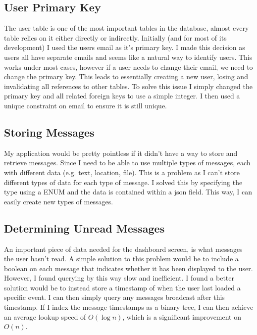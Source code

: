 \documentclass[a4paper,oneside,12pt,draft]{report}
\begin{document}
	\subsection{User Primary Key}
	The user table is one of the most important tables in the database, almost every table relies on it either directly or indirectly. Initially (and for most of its development) I used the users email as it's primary key. I made this decision as users all have separate emails and seems like a natural way to identify users. This works under most cases, however if a user needs to change their email, we need to change the primary key. This leads to essentially creating a new user, losing and invalidating all references to other tables. To solve this issue I simply changed the primary key and all related foreign keys to use a simple integer. I then used a unique constraint on email to ensure it is still unique.

	\subsection{Storing Messages}
	My application would be pretty pointless if it didn’t have a way to store and retrieve messages. Since I need to be able to use multiple types of messages, each with different data (e.g. text, location, file). This is a problem as I can’t store different types of data for each type of message. I solved this by specifying the type using a ENUM and the data is contained within a json field. This way, I can easily create new types of messages.

	\subsection{Determining Unread Messages}
	An important piece of data needed for the dashboard screen, is what messages the user hasn’t read. A simple solution to this problem would be to include a boolean on each message that indicates whether it has been displayed to the user. However, I found querying by this way slow and inefficient. I found a better solution would be to instead store a timestamp of when the user last loaded a specific event. I can then simply query any messages broadcast after this timestamp. If I index the message timestamps as a binary tree, I can then achieve an average lookup speed of \(O(\log n)\), which is a significant improvement on \(O(n)\).

	\begin{center}
	\end{center}
\end{document}
